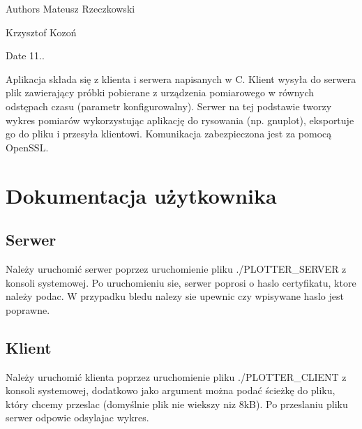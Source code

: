 \begin{DoxyAuthor}{Authors}
Mateusz Rzeczkowski 

Krzysztof Kozoń
\end{DoxyAuthor}
\begin{DoxyDate}{Date}
11..
\end{DoxyDate}
Aplikacja składa się z klienta i serwera napisanych w C. Klient wysyła do serwera plik zawierający próbki pobierane z urządzenia pomiarowego w równych odstępach czasu (parametr konfigurowalny). Serwer na tej podstawie tworzy wykres pomiarów wykorzystując aplikację do rysowania (np. gnuplot), eksportuje go do pliku i przesyła klientowi. Komunikacja zabezpieczona jest za pomocą Open\+S\+SL.\hypertarget{index_s1}{}\section{Dokumentacja użytkownika}\label{index_s1}
\hypertarget{index_ss1}{}\subsection{Serwer}\label{index_ss1}
Należy uruchomić serwer poprzez uruchomienie pliku ./\+P\+L\+O\+T\+T\+E\+R\+\_\+\+S\+E\+R\+V\+ER z konsoli systemowej. Po uruchomieniu sie, serwer poprosi o haslo certyfikatu, ktore należy podac. W przypadku bledu nalezy sie upewnic czy wpisywane haslo jest poprawne.\hypertarget{index_ss2}{}\subsection{Klient}\label{index_ss2}
Należy uruchomić klienta poprzez uruchomienie pliku ./\+P\+L\+O\+T\+T\+E\+R\+\_\+\+C\+L\+I\+E\+NT z konsoli systemowej, dodatkowo jako argument można podać ścieżkę do pliku, który chcemy przeslac (domyślnie plik nie wiekszy niz 8kB). Po przeslaniu pliku serwer odpowie odsylajac wykres. 